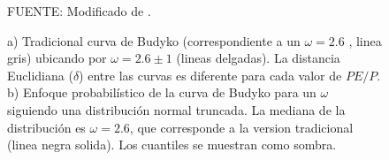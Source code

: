 \vspace{0.5cm}
\begin{figure}[htb!]
\centering
  \hfill
  \hfill
 \caption{a) Tradicional curva de Budyko (correspondiente a un $\omega = 2.6$ \citep{Fu1981,Zhang2004}, linea gris) ubicando por $\omega = 2.6 \pm 1$ (lineas delgadas). La distancia Euclidiana ($\delta$) entre las curvas es diferente para cada valor de $PE/P$. b) Enfoque probabilístico de la curva de Budyko para un $\omega$ siguiendo una distribución normal truncada. La mediana de la distribución es $\omega = 2.6$, que corresponde a la version tradicional (linea negra solida). Los cuantiles se muestran como sombra.}
 FUENTE: Modificado de \citet{Greve2015}.
 \label{fig:budyko02}
\end{figure}
